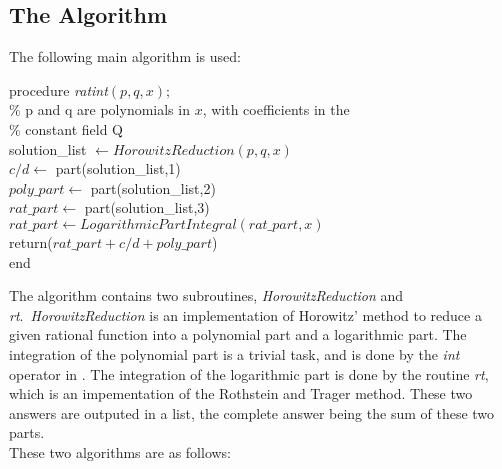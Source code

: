 \subsection{The Algorithm}
The following main algorithm is used:

\begin{flushleft}
procedure \textit{ratint}$(p,q,x);$ \\
\% p and q are polynomials in $x$, with coefficients in the \\
\% constant field Q \\
solution\_list $\leftarrow HorowitzReduction(p,q,x)$ \\
$c/d \leftarrow$ part(solution\_list,1) \\
$poly\_part \leftarrow$ part(solution\_list,2) \\
$rat\_part \leftarrow$ part(solution\_list,3) \\
$rat\_part \leftarrow LogarithmicPartIntegral(rat\_part,x)$ \\
return($rat\_part+c/d+poly\_part$) \\
end
\end{flushleft}

The algorithm contains two subroutines, \emph{HorowitzReduction} and \emph{rt}.\ \emph{HorowitzReduction} is an implementation of Horowitz' method to reduce a given rational function into a polynomial part and a logarithmic part. The integration of the polynomial part is a trivial task, and is done by the \emph{int} operator in \REDUCE. The integration of the logarithmic part is done by the routine \emph{rt}, which is an impementation of the Rothstein and Trager method. These two answers are outputed in a list, the complete answer being the sum of these two parts.
\\
These two algorithms are as follows:

